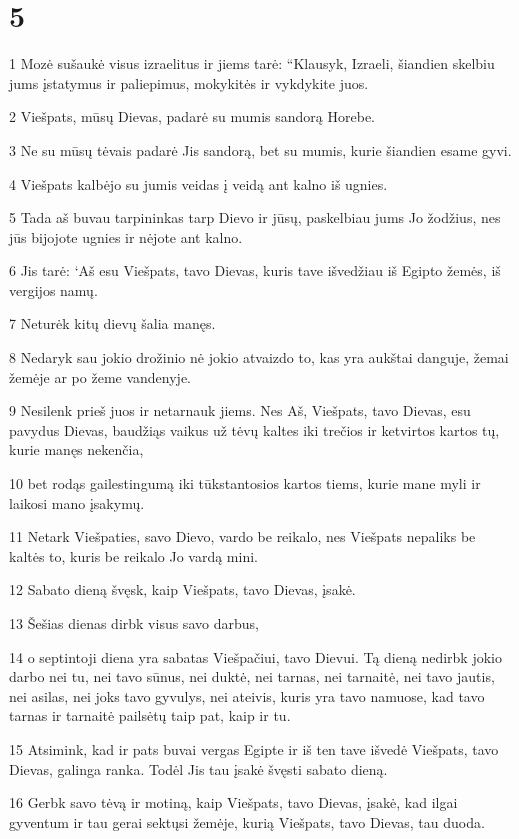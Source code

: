 \chapter{5}


\par 1 Mozė sušaukė visus izraelitus ir jiems tarė: “Klausyk, Izraeli, šiandien skelbiu jums įstatymus ir paliepimus, mokykitės ir vykdykite juos. 
\par 2 Viešpats, mūsų Dievas, padarė su mumis sandorą Horebe. 
\par 3 Ne su mūsų tėvais padarė Jis sandorą, bet su mumis, kurie šiandien esame gyvi. 
\par 4 Viešpats kalbėjo su jumis veidas į veidą ant kalno iš ugnies. 
\par 5 Tada aš buvau tarpininkas tarp Dievo ir jūsų, paskelbiau jums Jo žodžius, nes jūs bijojote ugnies ir nėjote ant kalno. 
\par 6 Jis tarė: ‘Aš esu Viešpats, tavo Dievas, kuris tave išvedžiau iš Egipto žemės, iš vergijos namų. 
\par 7 Neturėk kitų dievų šalia manęs. 
\par 8 Nedaryk sau jokio drožinio nė jokio atvaizdo to, kas yra aukštai danguje, žemai žemėje ar po žeme vandenyje. 
\par 9 Nesilenk prieš juos ir netarnauk jiems. Nes Aš, Viešpats, tavo Dievas, esu pavydus Dievas, baudžiąs vaikus už tėvų kaltes iki trečios ir ketvirtos kartos tų, kurie manęs nekenčia, 
\par 10 bet rodąs gailestingumą iki tūkstantosios kartos tiems, kurie mane myli ir laikosi mano įsakymų. 
\par 11 Netark Viešpaties, savo Dievo, vardo be reikalo, nes Viešpats nepaliks be kaltės to, kuris be reikalo Jo vardą mini. 
\par 12 Sabato dieną švęsk, kaip Viešpats, tavo Dievas, įsakė. 
\par 13 Šešias dienas dirbk visus savo darbus, 
\par 14 o septintoji diena yra sabatas Viešpačiui, tavo Dievui. Tą dieną nedirbk jokio darbo nei tu, nei tavo sūnus, nei duktė, nei tarnas, nei tarnaitė, nei tavo jautis, nei asilas, nei joks tavo gyvulys, nei ateivis, kuris yra tavo namuose, kad tavo tarnas ir tarnaitė pailsėtų taip pat, kaip ir tu. 
\par 15 Atsimink, kad ir pats buvai vergas Egipte ir iš ten tave išvedė Viešpats, tavo Dievas, galinga ranka. Todėl Jis tau įsakė švęsti sabato dieną. 
\par 16 Gerbk savo tėvą ir motiną, kaip Viešpats, tavo Dievas, įsakė, kad ilgai gyventum ir tau gerai sektųsi žemėje, kurią Viešpats, tavo Dievas, tau duoda. 
